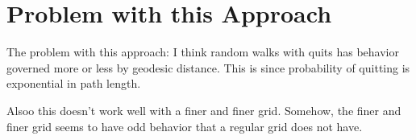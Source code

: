 \section{Problem with this Approach}
The problem with this approach: I think random walks with quits
has behavior governed more or less by geodesic distance. This is
since probability of quitting is exponential in path length.

Alsoo this doesn't work well with a finer and finer grid.
Somehow, the finer and finer grid seems to have odd behavior that
a regular grid does not have.
